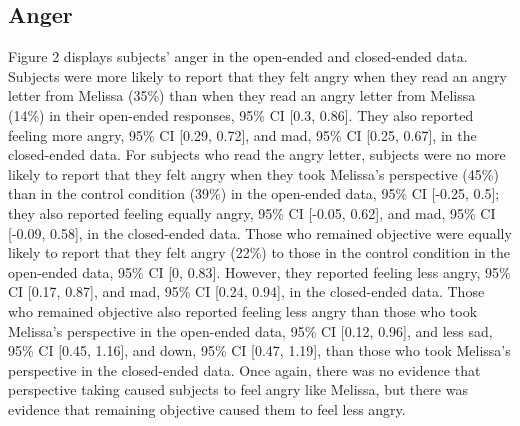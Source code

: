 \documentclass[man,a4paper,noextraspace,apacite]{apa6}
\begin{document}
\subsection{Anger}    


Figure 2 displays subjects' anger in the open-ended and closed-ended data. 
    Subjects were more likely to report that they felt angry when they read an angry letter from Melissa (35\%) than when they read an angry letter from Melissa (14\%) in their open-ended responses, 95\% CI [0.3, 0.86]. They also reported feeling more angry, 95\% CI [0.29, 0.72], and mad, 95\% CI [0.25, 0.67], in the closed-ended data.
    For subjects who read the angry letter, subjects were no more likely to report that they felt angry when they took Melissa's perspective (45\%) than in the control condition (39\%) in the open-ended data, 95\% CI [-0.25, 0.5]; they also reported feeling equally angry, 95\% CI [-0.05, 0.62], and mad, 95\% CI [-0.09, 0.58], in the closed-ended data. Those who remained objective were equally likely to report that they felt angry (22\%) to those in the control condition in the open-ended data, 95\% CI [0, 0.83]. However, they reported feeling less angry, 95\% CI [0.17, 0.87], and mad, 95\% CI [0.24, 0.94], in the closed-ended data. Those who remained objective also reported feeling less angry than those who took Melissa's perspective in the open-ended data, 95\% CI [0.12, 0.96], and less sad, 95\% CI [0.45, 1.16], and down, 95\% CI [0.47, 1.19], than those who took Melissa's perspective in the closed-ended data.
    Once again, there was no evidence that perspective taking caused subjects to feel angry like Melissa, but there was evidence that remaining objective caused them to feel less angry.
    
\end{document}
